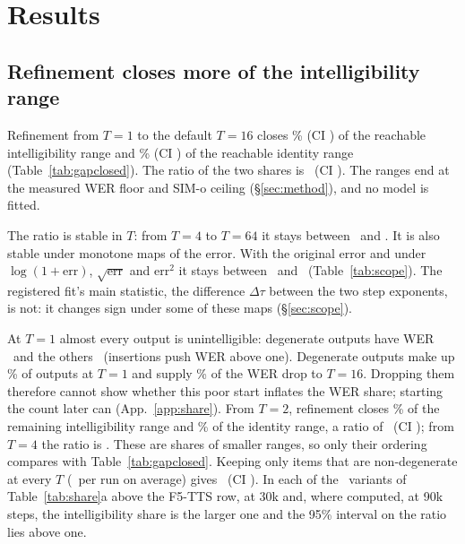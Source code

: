 \section{Results}
\subsection{Refinement closes more of the intelligibility range}
\label{sec:gapclosed}
Refinement from $T{=}1$ to the default $T{=}16$ closes \NgapWER\% (CI \NgapWERci) of the
reachable intelligibility range and \NgapSIM\% (CI \NgapSIMci) of the reachable identity
range (Table~\ref{tab:gapclosed}). The ratio of the two shares is \NgapRatio\ (CI
\NgapRatioci). The ranges end at the measured WER floor and SIM-o ceiling
(\S\ref{sec:method}), and no model is fitted.

\begin{table}[htbp]
  \centering
  \caption{\emph{Share of the reachable range closed by refinement}, from $T{=}1$ to each
  $T$, over all \Nruns\ runs at 30k steps. Brackets: 95\% intervals from a bootstrap over runs.}
  \label{tab:gapclosed}
  \small
  
\end{table}

The ratio is stable in $T$: from $T{=}4$ to $T{=}64$ it stays between \NgapRatioTLo\ and
\NgapRatioTHi. It is also stable under monotone maps of the error. With the
original error and under $\log(1+\mathrm{err})$, $\sqrt{\mathrm{err}}$ and $\mathrm{err}^{2}$
it stays between \NgapRatioLo\ and \NgapRatioHi\ (Table~\ref{tab:scope}). The registered
fit's main statistic, the difference $\Delta\tau$ between the two step exponents, is not: it
changes sign under some of these maps (\S\ref{sec:scope}).

At $T{=}1$ almost every output is unintelligible: degenerate outputs have WER
\NcrsWerToneDegen\ and the others \NcrsWerToneNondegen\ (insertions push WER above one).
Degenerate outputs make up \NcrsDegenShareTone\% of outputs at $T{=}1$ and supply
\NcrsDropFromDegen\% of the WER drop to $T{=}16$. Dropping them therefore cannot show
whether this poor start inflates the WER share; starting the count later can
(App.~\ref{app:share}). From $T{=}2$, refinement closes \NcrsFromTwoWER\% of the remaining
intelligibility range and \NcrsFromTwoSIM\% of the identity range, a ratio of
\NcrsFromTwoRatio\ (CI \NcrsFromTwoRatioci); from $T{=}4$ the ratio is \NcrsFromFourRatio.
These are shares of smaller ranges, so only their ordering compares with
Table~\ref{tab:gapclosed}. Keeping only items that are non-degenerate at every $T$
(\NcrsNdAllTItems\ per run on average) gives \NcrsNdAllTRatio\ (CI \NcrsNdAllTRatioci). In each
of the \NcrsOrderingVariants\ variants of Table~\ref{tab:share}a above the F5-TTS row, at 30k
and, where computed, at 90k steps, the intelligibility share is the larger one and the 95\%
interval on the ratio lies above one.

